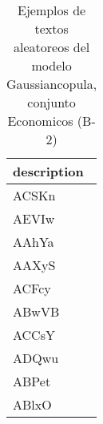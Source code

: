 \begin{table}[H]
\centering
\fontsize{8}{14}\selectfont
\caption{Ejemplos de textos aleatoreos del modelo Gaussiancopula, conjunto Economicos (B-2)}
\label{table-sample10-economicos-b-2-gaussiancopula-text}
\begin{tabular}{|m{50em}|}
\hline
\rowcolor[gray]{0.8}
description \\
\hline ACSKn \\
\hline AEVIw \\
\hline AAhYa \\
\hline AAXyS \\
\hline ACFcy \\
\hline ABwVB \\
\hline ACCsY \\
\hline ADQwu \\
\hline ABPet \\
\hline ABlxO \\
\hline
\end{tabular}
\end{table}

